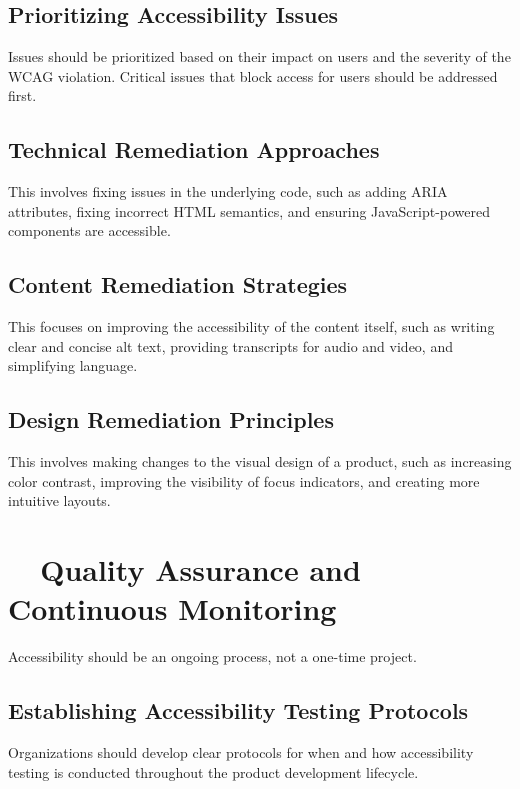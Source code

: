 \subsection{Prioritizing Accessibility Issues}
\label{subsec:prioritizing-issues}
Issues should be prioritized based on their impact on users and the severity of the WCAG violation. Critical issues that block access for users should be addressed first.
\supercite{PowerAccessibility}

\subsection{Technical Remediation Approaches}
\label{subsec:technical-remediation}
This involves fixing issues in the underlying code, such as adding ARIA attributes, fixing incorrect HTML semantics, and ensuring JavaScript-powered components are accessible.
\supercite{ARIA}

\subsection{Content Remediation Strategies}
\label{subsec:content-remediation}
This focuses on improving the accessibility of the content itself, such as writing clear and concise alt text, providing transcripts for audio and video, and simplifying language.
\supercite{WCAGNonText2018}

\subsection{Design Remediation Principles}
\label{subsec:design-remediation}
This involves making changes to the visual design of a product, such as increasing color contrast, improving the visibility of focus indicators, and creating more intuitive layouts.
\supercite{Ware2012}

\section{~~Quality Assurance and Continuous Monitoring}
\label{sec:qa-monitoring}
Accessibility should be an ongoing process, not a one-time project.

\subsection{Establishing Accessibility Testing Protocols}
\label{subsec:testing-protocols}
Organizations should develop clear protocols for when and how accessibility testing is conducted throughout the product development lifecycle.

